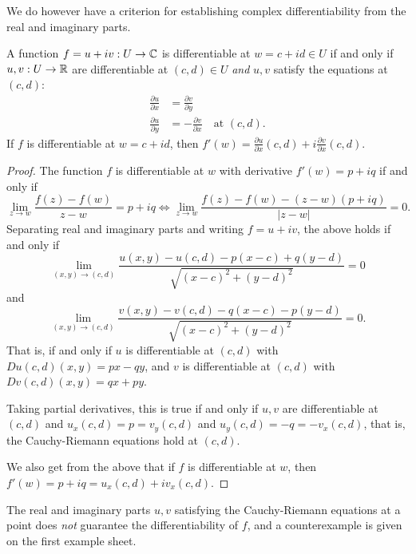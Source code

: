 \documentclass[a4paper]{scrartcl}
\begin{document}
We do however have a criterion for establishing complex differentiability from the real and imaginary parts.

\begin{theorem}
    A function $f = u + iv: U \rightarrow \mathbb{C}$ is differentiable at $w = c + id \in U$ if and only if $u, v : U \rightarrow \mathbb{R}$ are differentiable at $(c, d) \in U$ \emph{and} $u, v$ satisfy the  equations at $(c, d)$:
    \begin{align*}
        \frac{\partial u}{\partial x} &= \frac{\partial v}{\partial y} \\
        \frac{\partial u}{\partial y} &= - \frac{\partial v}{\partial x} \quad \text{at }(c, d).
    \end{align*}
    If $f$ is differentiable at $w = c + id$, then $f'(w) = \frac{\partial u}{\partial x}(c, d) + i \frac{\partial v}{\partial x} (c, d)$.
\end{theorem}
\begin{proof}
    The function $f$ is differentiable at $w$ with derivative $f'(w) = p + iq$ if and only if
    $$
    \lim _{z \rightarrow w} \frac{f(z)-f(w)}{z-w}=p+i q \iff \lim _{z \rightarrow w} \frac{f(z)-f(w)-(z-w)(p+i q)}{|z-w|}=0.
    $$
    Separating real and imaginary parts and writing $f = u + iv$, the above holds if and only if
    $$
    \lim _{(x, y) \rightarrow(c, d)} \frac{u(x, y)-u(c, d)-p(x-c)+q(y-d)}{\sqrt{(x-c)^{2}+(y-d)^{2}}}=0
    $$
    and
    $$
    \lim _{(x, y) \rightarrow(c, d)} \frac{v(x, y)-v(c, d)-q(x-c)-p(y-d)}{\sqrt{(x-c)^{2}+(y-d)^{2}}}=0.
    $$
    That is, if and only if $u$ is differentiable at $(c, d)$ with $Du(c, d)(x, y) = px - qy$, and $v$ is differentiable at $(c, d)$ with $Dv(c, d)(x, y) = qx + py$. 

    Taking partial derivatives, this is true if and only if $u, v$ are differentiable at $(c, d)$ and $u_x(c, d) = p = v_y(c, d)$ and $u_y(c, d) = -q = -v_x(c, d)$, that is, the Cauchy-Riemann equations hold at $(c, d)$.

    We also get from the above that if $f$ is differentiable at $w$, then $f'(w) = p + iq = u_x(c, d) + i v_x(c, d)$.
\end{proof}

\begin{remark}[Warning]
    The real and imaginary parts
    $u, v$ satisfying the Cauchy-Riemann equations at a point does \emph{not} guarantee the differentiability of $f$, and a counterexample is given on the first example sheet.
\end{remark}
\end{document}

